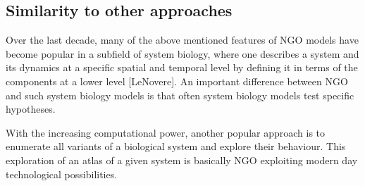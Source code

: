 \subsection{Similarity to other approaches}

Over the last decade, many of the above mentioned features of NGO models have become popular in a subfield of system biology, where one describes a system and its dynamics at a specific spatial and temporal level by defining it in terms of the components at a lower level [LeNovere]. An important difference between NGO and such system biology models is that often system biology models test specific hypotheses. 

With the increasing computational power, another popular approach is to enumerate all variants of a biological system and explore their behaviour. This exploration of an atlas of a given system is basically NGO exploiting modern day technological possibilities.

